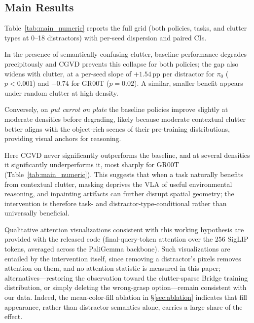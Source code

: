 \documentclass[letterpaper, 10 pt, conference]{ieeeconf}  %
\begin{document}
\subsection{Main Results}
\label{sec:main_results}
Table~\ref{tab:main_numeric} reports the full grid (both policies, tasks, and clutter types at 0--18 distractors) with per-seed dispersion and paired CIs.

In the presence of semantically confusing clutter, baseline performance degrades precipitously and CGVD prevents this collapse for both policies; the gap also widens with clutter, at a per-seed slope of $+1.54$\,pp per distractor for $\pi_0$ ($p{<}0.001$) and $+0.74$ for GR00T ($p{=}0.02$). A similar, smaller benefit appears under random clutter at high density.

Conversely, on \textit{put carrot on plate} the baseline policies improve slightly at moderate densities before degrading, likely because moderate contextual clutter better aligns with the object-rich scenes of their pre-training distributions, providing visual anchors for reasoning.

Here CGVD never significantly outperforms the baseline, and at several densities it significantly underperforms it, most sharply for GR00T (Table~\ref{tab:main_numeric}). This suggests that when a task naturally benefits from contextual clutter, masking deprives the VLA of useful environmental reasoning, and inpainting artifacts can further disrupt spatial geometry; the intervention is therefore task- and distractor-type-conditional rather than universally beneficial.

Qualitative attention visualizations consistent with this working hypothesis are provided with the released code (final-query-token attention over the 256 SigLIP tokens, averaged across the PaliGemma backbone). Such visualizations are entailed by the intervention itself, since removing a distractor's pixels removes attention on them, and no attention statistic is measured in this paper; alternatives---restoring the observation toward the clutter-sparse Bridge training distribution, or simply deleting the wrong-grasp option---remain consistent with our data. Indeed, the mean-color-fill ablation in \S\ref{sec:ablation} indicates that fill appearance, rather than distractor semantics alone, carries a large share of the effect.
\end{document}
